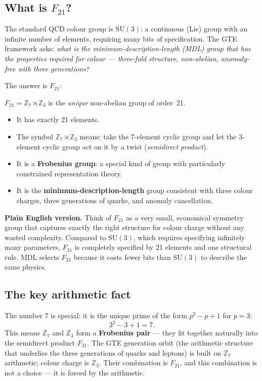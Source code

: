 \documentclass[11pt,a4paper]{article}
\newcommand{\term}[1]{\textbf{#1}}
\begin{document}
\subsection{What is $F_{21}$?}

The standard QCD colour group is $\mathrm{SU}(3)$: a continuous (Lie) group with an infinite number of elements, requiring many bits of specification.  The GTE framework asks: \emph{what is the minimum-description-length (MDL) group that has the properties required for colour --- three-fold structure, non-abelian, anomaly-free with three generations?}

The answer is $F_{21}$:

\begin{tcolorbox}[colback=boxblue,colframe=blue!40!black,title=What is $F_{21}$?]
\textbf{$F_{21} = \mathbb{Z}_7 \rtimes \mathbb{Z}_3$} is the \emph{unique} non-abelian group of order~21.

\begin{itemize}
  \item It has exactly 21 elements.
  \item The symbol $\mathbb{Z}_7 \rtimes \mathbb{Z}_3$ means: take the 7-element cyclic group
        and let the 3-element cyclic group act on it by a twist (\emph{semidirect product}).
  \item It is a \term{Frobenius group}: a special kind of group with particularly constrained
        representation theory.
  \item It is the \textbf{minimum-description-length} group consistent with three colour charges,
        three generations of quarks, and anomaly cancellation.
\end{itemize}
\end{tcolorbox}

\medskip
\noindent\textbf{Plain English version.}  Think of $F_{21}$ as a very small, economical symmetry group that captures exactly the right structure for colour charge without any wasted complexity.  Compared to $\mathrm{SU}(3)$, which requires specifying infinitely many parameters, $F_{21}$ is completely specified by 21 elements and one structural rule.  MDL selects $F_{21}$ because it costs fewer bits than $\mathrm{SU}(3)$ to describe the same physics.

\subsection{The key arithmetic fact}

The number 7 is special: it is the unique prime of the form $p^2 - p + 1$ for $p = 3$:
\[
  3^2 - 3 + 1 = 7.
\]
This means $\mathbb{Z}_7$ and $\mathbb{Z}_3$ form a \term{Frobenius pair} --- they fit together naturally into the semidirect product $F_{21}$.  The GTE generation orbit (the arithmetic structure that underlies the three generations of quarks and leptons) is built on $\mathbb{Z}_7$ arithmetic; colour charge is $\mathbb{Z}_3$.  Their combination is $F_{21}$, and this combination is not a choice --- it is forced by the arithmetic.
\end{document}
